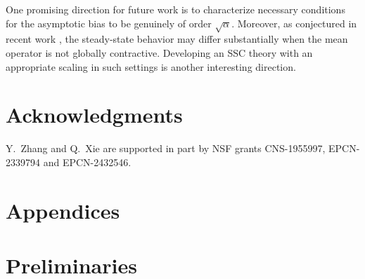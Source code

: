 \documentclass[11pt,letterpaper]{article}
\theoremstyle{plain}
\theoremstyle{definition}
\theoremstyle{remark}
\begin{document}
One promising direction for future work is to characterize necessary
conditions for the asymptotic bias to be genuinely of order
\(\sqrt{\alpha}\). Moreover, as conjectured in recent work
\cite{wang2026steady}, the steady-state behavior may differ substantially
when the mean operator is not globally contractive. Developing an SSC theory
with an appropriate scaling in such settings is another interesting
direction.


\section*{Acknowledgments}
Y.\ Zhang and Q.\ Xie are supported in part by NSF grants CNS-1955997, EPCN-2339794 and EPCN-2432546.


 
 


\clearpage
\appendix
\section*{Appendices}


\section{Preliminaries}
\end{document}
